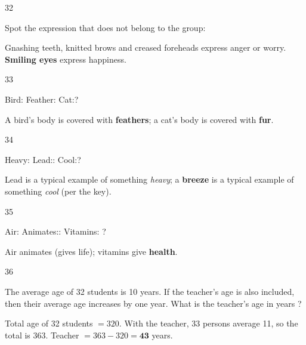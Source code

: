 \begin{question}{32}
{Spot the expression that does not belong to the group:\par}
\begin{explain}
Gnashing teeth, knitted brows and creased foreheads express anger or worry. \textbf{Smiling eyes} express happiness.
\end{explain}
\end{question}

\begin{question}{33}
{Bird: Feather: Cat:?\par}
\begin{explain}
A bird's body is covered with \textbf{feathers}; a cat's body is covered with \textbf{fur}.
\end{explain}
\end{question}

\begin{question}{34}
{Heavy: Lead:: Cool:?\par}
\begin{explain}
Lead is a typical example of something \emph{heavy}; a \textbf{breeze} is a typical example of something \emph{cool} (per the key).
\end{explain}
\end{question}

\begin{question}{35}
{Air: Animates:: Vitamins: ?\par}
\begin{explain}
Air animates (gives life); vitamins give \textbf{health}.
\end{explain}
\end{question}

\begin{question}{36}
{The average age of 32 students is 10 years. If the teacher's age is also included, then their average age increases by one year. What is the teacher's age in years ?\par}
\begin{explain}
Total age of 32 students $=320$. With the teacher, 33 persons average 11, so the total is $363$. Teacher $=363-320=\mathbf{43}$ years.
\end{explain}
\end{question}


